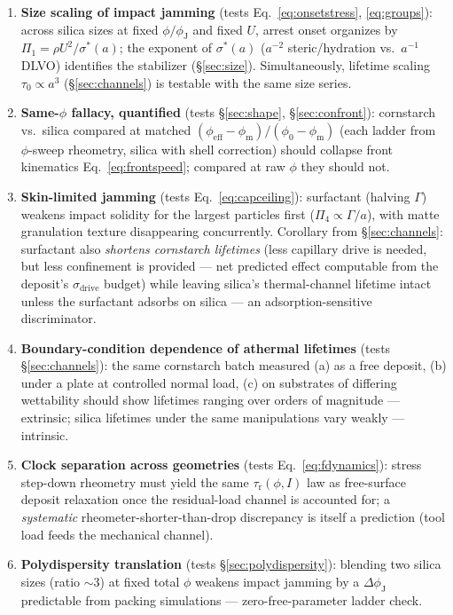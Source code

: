 \documentclass[11pt]{article}
\newcommand{\phiJ}{\phi_{\mathrm{J}}}
\newcommand{\phiO}{\phi_{0}}
\newcommand{\phiM}{\phi_{\mathrm{m}}}
\newcommand{\sigmastar}{\sigma^{*}}
\begin{document}
\begin{enumerate}
\item \textbf{Size scaling of impact jamming} (tests Eq.~\eqref{eq:onsetstress}, \eqref{eq:groups}): across silica sizes at fixed $\phi/\phiJ$ and fixed $U$, arrest onset organizes by $\Pi_1 = \rho U^2/\sigmastar(a)$; the exponent of $\sigmastar(a)$ ($a^{-2}$ steric/hydration vs.\ $a^{-1}$ DLVO) identifies the stabilizer (\S\ref{sec:size}). Simultaneously, lifetime scaling $\tau_{0} \propto a^{3}$ (\S\ref{sec:channels}) is testable with the same size series.
\item \textbf{Same-$\phi$ fallacy, quantified} (tests \S\ref{sec:shape}, \S\ref{sec:confront}): cornstarch vs.\ silica compared at matched $(\phi_{\mathrm{eff}}-\phiM)/(\phiO-\phiM)$ (each ladder from $\phi$-sweep rheometry, silica with shell correction) should collapse front kinematics Eq.~\eqref{eq:frontspeed}; compared at raw $\phi$ they should not.
\item \textbf{Skin-limited jamming} (tests Eq.~\eqref{eq:capceiling}): surfactant (halving $\Gamma$) weakens impact solidity for the largest particles first ($\Pi_4 \propto \Gamma/a$), with matte granulation texture disappearing concurrently. Corollary from \S\ref{sec:channels}: surfactant also \emph{shortens cornstarch lifetimes} (less capillary drive is needed, but less confinement is provided --- net predicted effect computable from the deposit's $\sigma_{\mathrm{drive}}$ budget) while leaving silica's thermal-channel lifetime intact unless the surfactant adsorbs on silica --- an adsorption-sensitive discriminator.
\item \textbf{Boundary-condition dependence of athermal lifetimes} (tests \S\ref{sec:channels}): the same cornstarch batch measured (a) as a free deposit, (b) under a plate at controlled normal load, (c) on substrates of differing wettability should show lifetimes ranging over orders of magnitude --- extrinsic; silica lifetimes under the same manipulations vary weakly --- intrinsic.
\item \textbf{Clock separation across geometries} (tests Eq.~\eqref{eq:fdynamics}): stress step-down rheometry must yield the same $\tau_{\mathrm{r}}(\phi,I)$ law as free-surface deposit relaxation once the residual-load channel is accounted for; a \emph{systematic} rheometer-shorter-than-drop discrepancy is itself a prediction (tool load feeds the mechanical channel).
\item \textbf{Polydispersity translation} (tests \S\ref{sec:polydispersity}): blending two silica sizes (ratio $\sim$3) at fixed total $\phi$ weakens impact jamming by a $\Delta\phiJ$ predictable from packing simulations --- zero-free-parameter ladder check.

\end{enumerate}
\end{document}
